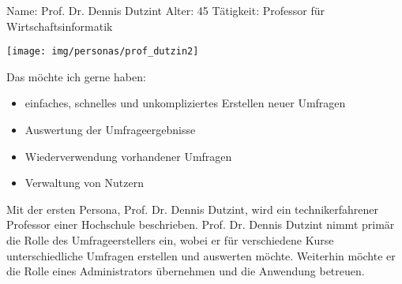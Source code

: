 

% 
\newpage
{}
\begin{minipage}[t]{0.5\textwidth} 	\vspace{0.2\baselineskip} %
	\begin{entrylist}
		\entry
		{Name:}
		{Prof. Dr. Dennis Dutzint}
			\entry
		{Alter:}
		{45}
		\entry
		{Tätigkeit:}
		{Professor für Wirtschaftsinformatik}
	\end{entrylist}
	\begin{barchart}{5.0}\hspace{-1mm}
	\end{barchart}
\end{minipage}
\hfil
\begin{minipage}[t]{0.4\textwidth} 	\vspace{0.0\baselineskip} %
	\flushright
	\texttt{[image: img/personas/prof\_dutzin2]}
\end{minipage}
\autocite{rf-unsplash-dozent}

Das möchte ich gerne haben:
\begin{itemize}
	\item einfaches, schnelles und unkompliziertes Erstellen neuer Umfragen
	\item Auswertung der Umfrageergebnisse
    \item Wiederverwendung vorhandener Umfragen
    \item Verwaltung von Nutzern
\end{itemize}

Mit der ersten Persona, Prof. Dr. Dennis Dutzint, wird ein technikerfahrener Professor einer Hochschule beschrieben.
Prof. Dr. Dennis Dutzint nimmt primär die Rolle des Umfrageerstellers ein, wobei er für verschiedene Kurse unterschiedliche Umfragen erstellen und auswerten möchte.
Weiterhin möchte er die Rolle eines Administrators übernehmen und die Anwendung betreuen.
